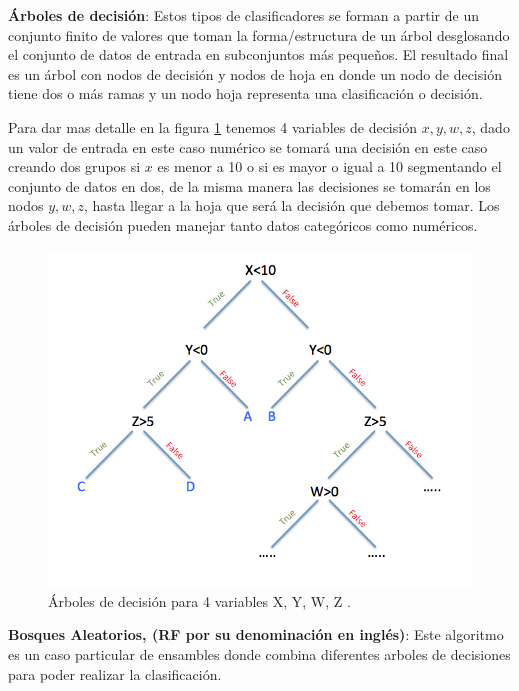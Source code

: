 \par \textbf{Árboles de decisión}: Estos tipos de clasificadores se forman a partir de  un conjunto finito de valores  que toman la forma/estructura de un árbol desglosando el conjunto de datos de entrada en subconjuntos más pequeños. El resultado final es un árbol con nodos de decisión y nodos de hoja en donde un nodo de decisión tiene dos o más ramas y un nodo hoja representa una clasificación o decisión. 

Para dar mas detalle en la figura \ref{Fig: decision-tree} tenemos 4 variables de decisión $ x, y, w, z$, dado un valor  de entrada en este caso numérico se tomará una decisión en este caso creando dos grupos  si $ x$  es menor a 10 o si es mayor o igual a 10 segmentando el conjunto de datos en dos, de la misma manera las decisiones se tomarán en los nodos $ y, w, z$, hasta llegar a la hoja que será la decisión que debemos tomar. Los árboles de decisión pueden manejar tanto datos categóricos como numéricos.

  
\begin{figure}[H]
 \centering
  \includegraphics[scale=0.3,keepaspectratio=true,clip=true]{imagenes/MarcoTeorico/decision-tree.png}
  \caption{Árboles de decisión para 4 variables X, Y, W, Z .}%
  \label{Fig: decision-tree}
\end{figure}


\par \textbf{Bosques Aleatorios, (RF por su denominación en inglés)}: Este  algoritmo es un caso particular de ensambles donde combina diferentes arboles de decisiones para poder realizar la clasificación.

